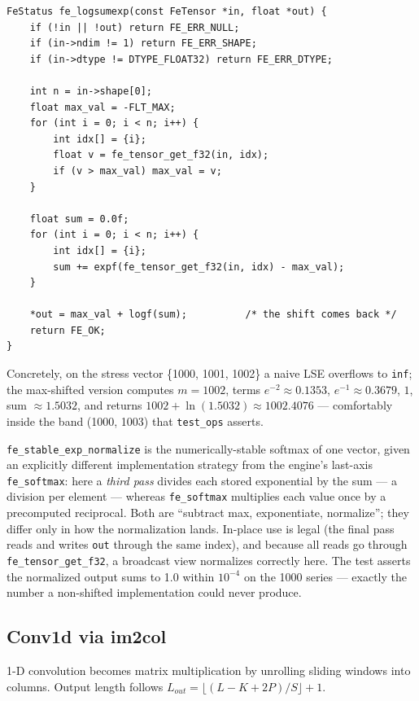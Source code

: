 \documentclass[11pt,a4paper]{article}
\begin{document}
\begin{lstlisting}[style=cstyle,caption={ops/stability.c --- fe\_logsumexp, two passes over a 1-D vector}]
FeStatus fe_logsumexp(const FeTensor *in, float *out) {
    if (!in || !out) return FE_ERR_NULL;
    if (in->ndim != 1) return FE_ERR_SHAPE;
    if (in->dtype != DTYPE_FLOAT32) return FE_ERR_DTYPE;

    int n = in->shape[0];
    float max_val = -FLT_MAX;
    for (int i = 0; i < n; i++) {
        int idx[] = {i};
        float v = fe_tensor_get_f32(in, idx);
        if (v > max_val) max_val = v;
    }

    float sum = 0.0f;
    for (int i = 0; i < n; i++) {
        int idx[] = {i};
        sum += expf(fe_tensor_get_f32(in, idx) - max_val);
    }

    *out = max_val + logf(sum);          /* the shift comes back */
    return FE_OK;
}
\end{lstlisting}

Concretely, on the stress vector \{1000, 1001, 1002\} a naive LSE overflows to
\texttt{inf}; the max-shifted version computes $m=1002$, terms
$e^{-2}\approx0.1353$, $e^{-1}\approx0.3679$, $1$, sum $\approx1.5032$, and
returns $1002+\ln(1.5032)\approx1002.4076$ --- comfortably inside the band
(1000, 1003) that \texttt{test\_ops} asserts.

\texttt{fe\_stable\_exp\_normalize} is the numerically-stable softmax of one
vector, given an explicitly different implementation strategy from the
engine's last-axis \texttt{fe\_softmax}: here a \emph{third pass} divides each
stored exponential by the sum --- a division per element --- whereas
\texttt{fe\_softmax} multiplies each value once by a precomputed reciprocal.
Both are ``subtract max, exponentiate, normalize''; they differ only in how the
normalization lands. In-place use is legal (the final pass reads and writes
\texttt{out} through the same index), and because all reads go through
\texttt{fe\_tensor\_get\_f32}, a broadcast view normalizes correctly here. The
test asserts the normalized output sums to 1.0 within $10^{-4}$ on the 1000
series --- exactly the number a non-shifted implementation could never produce.
\subsection{Conv1d via im2col}

1-D convolution becomes matrix multiplication by unrolling sliding windows
into columns. Output length follows
$L_{out} = \lfloor (L - K + 2P)/S \rfloor + 1$.
\end{document}
